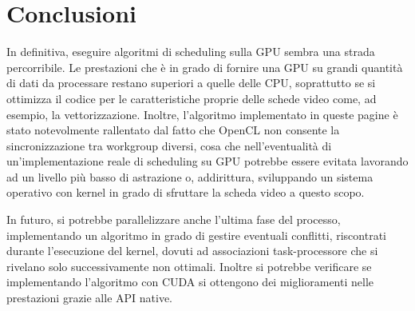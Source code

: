 \chapter{Conclusioni}
In definitiva, eseguire algoritmi di scheduling sulla GPU sembra una strada
percorribile.
Le prestazioni che è in grado di fornire una GPU su grandi
quantità di dati da processare restano superiori a quelle delle CPU, soprattutto
se si ottimizza il codice per le caratteristiche proprie delle schede video come,
ad esempio, la vettorizzazione. 
Inoltre, l’algoritmo implementato in queste pagine è stato notevolmente
rallentato dal fatto che OpenCL non consente la sincronizzazione tra workgroup
diversi, cosa che nell’eventualità di un’implementazione reale di scheduling su
GPU potrebbe essere evitata lavorando ad un livello più basso di astrazione
o, addirittura, sviluppando un sistema operativo con kernel in grado di sfruttare la scheda video a questo scopo.

In futuro, si potrebbe parallelizzare anche l'ultima fase del processo, implementando un algoritmo in grado di gestire eventuali conflitti, riscontrati durante l'esecuzione del kernel, dovuti ad associazioni task-processore che si rivelano solo successivamente non ottimali. 
Inoltre si potrebbe verificare se implementando l'algoritmo con CUDA si ottengono dei miglioramenti nelle prestazioni grazie alle API native.